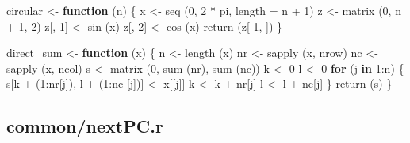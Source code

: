 \documentclass[
  12pt,
  letterpaper,
  DIV=11,
  numbers=noendperiod]{scrreprt}
\newenvironment{Shaded}{\begin{snugshade}}{\end{snugshade}}
\newcommand{\AttributeTok}[1]{\textcolor[rgb]{0.40,0.45,0.13}{#1}}
\newcommand{\ControlFlowTok}[1]{\textcolor[rgb]{0.00,0.23,0.31}{\textbf{#1}}}
\newcommand{\DecValTok}[1]{\textcolor[rgb]{0.68,0.00,0.00}{#1}}
\newcommand{\FunctionTok}[1]{\textcolor[rgb]{0.28,0.35,0.67}{#1}}
\newcommand{\NormalTok}[1]{\textcolor[rgb]{0.00,0.23,0.31}{#1}}
\newcommand{\OtherTok}[1]{\textcolor[rgb]{0.00,0.23,0.31}{#1}}
\newcommand{\SpecialCharTok}[1]{\textcolor[rgb]{0.37,0.37,0.37}{#1}}
\theoremstyle{remark}
\begin{document}
\begin{Shaded}
\begin{Highlighting}[]
\NormalTok{circular }\OtherTok{\textless{}{-}} \ControlFlowTok{function}\NormalTok{ (n) \{}
\NormalTok{  x }\OtherTok{\textless{}{-}} \FunctionTok{seq}\NormalTok{ (}\DecValTok{0}\NormalTok{, }\DecValTok{2} \SpecialCharTok{*}\NormalTok{ pi, }\AttributeTok{length =}\NormalTok{ n }\SpecialCharTok{+} \DecValTok{1}\NormalTok{)}
\NormalTok{  z }\OtherTok{\textless{}{-}} \FunctionTok{matrix}\NormalTok{ (}\DecValTok{0}\NormalTok{, n }\SpecialCharTok{+} \DecValTok{1}\NormalTok{, }\DecValTok{2}\NormalTok{)}
\NormalTok{  z[, }\DecValTok{1}\NormalTok{] }\OtherTok{\textless{}{-}} \FunctionTok{sin}\NormalTok{ (x)}
\NormalTok{  z[, }\DecValTok{2}\NormalTok{] }\OtherTok{\textless{}{-}} \FunctionTok{cos}\NormalTok{ (x)}
  \FunctionTok{return}\NormalTok{ (z[}\SpecialCharTok{{-}}\DecValTok{1}\NormalTok{, ])}
\NormalTok{\}}

\NormalTok{direct\_sum }\OtherTok{\textless{}{-}} \ControlFlowTok{function}\NormalTok{ (x) \{}
\NormalTok{  n }\OtherTok{\textless{}{-}} \FunctionTok{length}\NormalTok{ (x)}
\NormalTok{  nr }\OtherTok{\textless{}{-}} \FunctionTok{sapply}\NormalTok{ (x, nrow)}
\NormalTok{  nc }\OtherTok{\textless{}{-}} \FunctionTok{sapply}\NormalTok{ (x, ncol)}
\NormalTok{  s }\OtherTok{\textless{}{-}} \FunctionTok{matrix}\NormalTok{ (}\DecValTok{0}\NormalTok{, }\FunctionTok{sum}\NormalTok{ (nr), }\FunctionTok{sum}\NormalTok{ (nc))}
\NormalTok{  k }\OtherTok{\textless{}{-}} \DecValTok{0}
\NormalTok{  l }\OtherTok{\textless{}{-}} \DecValTok{0}
  \ControlFlowTok{for}\NormalTok{ (j }\ControlFlowTok{in} \DecValTok{1}\SpecialCharTok{:}\NormalTok{n) \{}
\NormalTok{    s[k }\SpecialCharTok{+}\NormalTok{ (}\DecValTok{1}\SpecialCharTok{:}\NormalTok{nr[j]), l }\SpecialCharTok{+}\NormalTok{ (}\DecValTok{1}\SpecialCharTok{:}\NormalTok{nc [j])] }\OtherTok{\textless{}{-}}\NormalTok{ x[[j]]}
\NormalTok{    k }\OtherTok{\textless{}{-}}\NormalTok{ k }\SpecialCharTok{+}\NormalTok{ nr[j]}
\NormalTok{    l }\OtherTok{\textless{}{-}}\NormalTok{ l }\SpecialCharTok{+}\NormalTok{ nc[j]}
\NormalTok{  \}}
  \FunctionTok{return}\NormalTok{ (s)}
\NormalTok{\}}
\end{Highlighting}
\end{Shaded}

\subsection*{common/nextPC.r}\label{appermcode}
\end{document}

